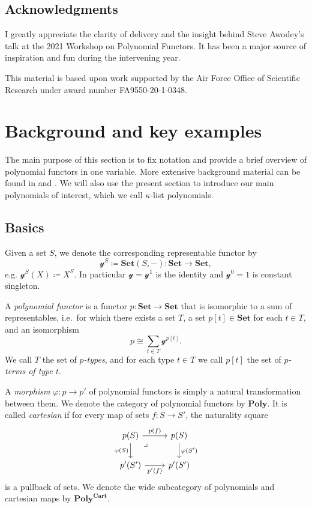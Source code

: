 \documentclass[11pt, one side, article]{memoir}
\theoremstyle{definition}
\theoremstyle{plain}
\newenvironment{definition}
  {\pushQED{\qed}\renewcommand{\qedsymbol}{$\lozenge$}\definitionx}
  {\popQED\enddefinitionx}
\newcommand{\Cat}[1]{\mathbf{#1}}%
\newcommand{\smset}{\Cat{Set}}
\newcommand{\yon}{\mathcal{y}}
\newcommand{\poly}{\Cat{Poly}}
\newcommand{\polycart}{\poly^{\Cat{Cart}}}
\newcommand{\0}{\textsf{0}}
\newcommand{\1}{\tn{\textsf{1}}}
\begin{document}
\section{Acknowledgments}

I greatly appreciate the clarity of delivery and the insight behind Steve Awodey's talk at the 2021 Workshop on Polynomial Functors. It has been a major source of inspiration and fun during the intervening year. 

This material is based upon work supported by the Air Force Office of Scientific Research under award number FA9550-20-1-0348.

\chapter{Background and key examples}

The main purpose of this section is to fix notation and provide a brief overview of polynomial functors in one variable. More extensive background material can be found in \cite{spivak2022poly} and \cite{kock2012polynomial}. We will also use the present section to introduce our main polynomials of interest, which we call $\kappa$-list polynomials.

\section{Basics}

\begin{definition}[Polynomial functor]\label{def.poly}
Given a set $S$, we denote the corresponding representable functor by
\[\yon^S\coloneqq\smset(S,-)\colon\smset\to\smset,\]
e.g. $\yon^S(X)\coloneqq X^S$. In particular $\yon=\yon^1$ is the identity and $\yon^0=1$ is constant singleton.

A \emph{polynomial functor} is a functor $p\colon\smset\to\smset$ that is isomorphic to a sum of representables, i.e.\ for which there exists a set $T$, a set $p[t]\in\smset$ for each $t\in T$, and an isomorphism
\[
p\cong\sum_{t\in T}\yon^{p[t]}.
\]
We call $T$ the set of \emph{$p$-types}, and for each type $t\in T$ we call $p[t]$ the set of \emph{$p$-terms of type $t$}. 

A \emph{morphism} $\varphi\colon p\to p'$ of polynomial functors is simply a natural transformation between them. We denote the category of polynomial functors by $\poly$. It is called \emph{cartesian} if for every map of sets $f\colon S\to S'$, the naturality square
\[
\begin{tikzcd}
  p(S)\ar[r, "p(f)"]\ar[d, "\varphi(S)"']&p(S)\ar[d, "\varphi(S')"]\\
  p'(S')\ar[r, "p'(f)"']&p'(S')\ar[ul, phantom, very near end, "\lrcorner"]
\end{tikzcd}
\]
is a pullback of sets. We denote the wide subcategory of polynomials and cartesian maps by $\polycart$.
\end{definition}
\end{document}
